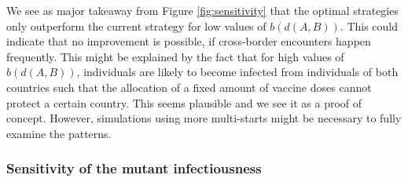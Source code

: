 We see as major takeaway from Figure \ref{fig:sensitivity} that the optimal strategies only outperform the current strategy for low values of $b(d(A,B))$. This could indicate that no improvement is possible, if cross-border encounters happen frequently. This might be explained by the fact that for high values of $b(d(A,B))$, individuals are likely to become infected from individuals of both countries such that the allocation of a fixed amount of vaccine doses cannot protect a certain country. This seems plausible and we see it as a proof of concept. However, simulations using more multi-starts might be necessary to fully examine the patterns.



\subsubsection{Sensitivity of the mutant infectiousness}
\label{A:eta}

